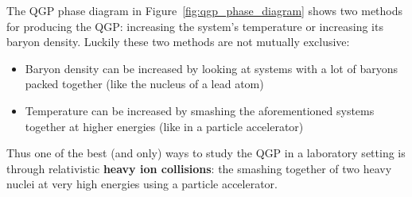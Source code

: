 The QGP phase diagram in Figure~\ref{fig:qgp_phase_diagram} shows two methods for producing the QGP: increasing the system's temperature or increasing its baryon density. Luckily these two methods are not mutually exclusive: 
\begin{itemize}
    \item Baryon density can be increased by looking at systems with a lot of baryons packed together (like the nucleus of a lead atom)
    \item Temperature can be increased by smashing the aforementioned systems together at higher energies (like in a particle accelerator)
\end{itemize}
Thus one of the best (and only) ways to study the QGP in a laboratory setting is through relativistic \textbf{heavy ion collisions}: the smashing together of two heavy nuclei at very high energies using a particle accelerator. 

